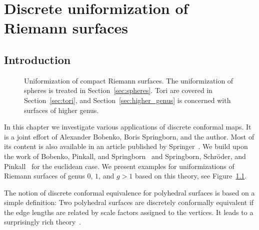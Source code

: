 \documentclass[Thesis]{subfiles}
\begin{document}

\chapter{Discrete uniformization of Riemann surfaces}
\label{chp:uniformization}

\section{Introduction}

\begin{figure}
\centering
{}
\caption{
Uniformization of compact Riemann surfaces. 
The uniformization of spheres is treated in
Section~\ref{sec:spheres}. Tori are covered in
Section~\ref{sec:tori}, and Section~\ref{sec:higher_genus} is
concerned with surfaces of higher genus.
}
\label{fig:intro_uniformization}
\end{figure}

In this chapter we investigate various applications of discrete conformal maps. 
It is a joint effort of Alexander Bobenko, Boris Springborn, and the author. Most of its content is also available in an article published by Springer~\cite{BobSechSpr}.
We build upon the work of Bobenko, Pinkall, and Springborn~\cite{BPS2015:dconf} and Springborn, Schr\"{o}der, and Pinkall~\cite{Springborn2008} for the euclidean case. 
We present examples for uniformizations of Riemann surfaces of genus $0$, $1$, and $g>1$ based on this theory, see Figure~\ref{fig:intro_uniformization}.

The notion of discrete conformal equivalence for polyhedral surfaces
is based on a simple definition: Two polyhedral surfaces are
discretely conformally equivalent if the edge lengths are related by
scale factors assigned to the vertices. It leads to a surprisingly
rich theory~\cite{Luo2004:Yamabe, BPS2015:dconf, Luo-Uniformization, Luo-Uniformization_II}.
\end{document}
